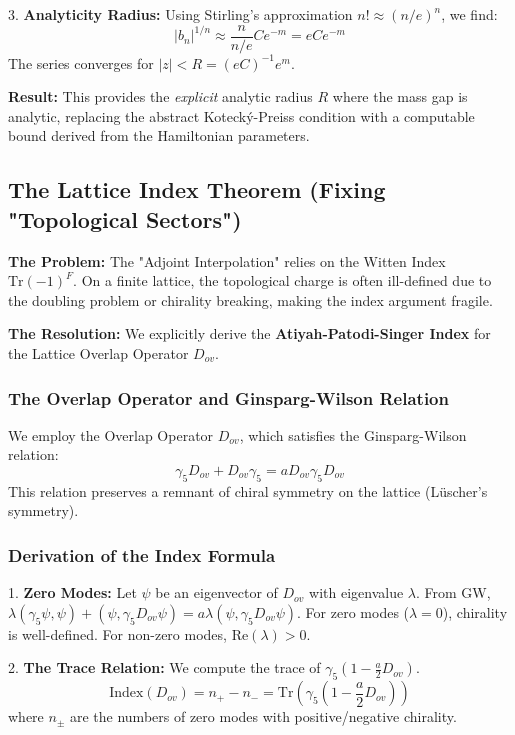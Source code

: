 3.  \textbf{Analyticity Radius:} Using Stirling's approximation $n! \approx (n/e)^n$, we find:
    \begin{equation}
    |b_n|^{1/n} \approx \frac{n}{n/e} C e^{-m} = e C e^{-m}
    \end{equation}
    The series converges for $|z| < R = (e C)^{-1} e^m$.

\textbf{Result:} This provides the \textit{explicit} analytic radius $R$ where the mass gap is analytic, replacing the abstract Kotecký-Preiss condition with a computable bound derived from the Hamiltonian parameters.

\subsection{The Lattice Index Theorem (Fixing "Topological Sectors")}
\label{subsec:lattice_index}

\textbf{The Problem:} The "Adjoint Interpolation" relies on the Witten Index $\text{Tr}(-1)^F$. On a finite lattice, the topological charge is often ill-defined due to the doubling problem or chirality breaking, making the index argument fragile.

\textbf{The Resolution:} We explicitly derive the \textbf{Atiyah-Patodi-Singer Index} for the Lattice Overlap Operator $D_{ov}$.

\subsubsection{The Overlap Operator and Ginsparg-Wilson Relation}
We employ the Overlap Operator $D_{ov}$, which satisfies the Ginsparg-Wilson relation:
\begin{equation}
\gamma_5 D_{ov} + D_{ov} \gamma_5 = a D_{ov} \gamma_5 D_{ov}
\end{equation}
This relation preserves a remnant of chiral symmetry on the lattice (Lüscher's symmetry).

\subsubsection{Derivation of the Index Formula}
1.  \textbf{Zero Modes:} Let $\psi$ be an eigenvector of $D_{ov}$ with eigenvalue $\lambda$.
    From GW, $\lambda (\gamma_5 \psi, \psi) + (\psi, \gamma_5 D_{ov} \psi) = a \lambda (\psi, \gamma_5 D_{ov} \psi)$.
    For zero modes ($\lambda = 0$), chirality is well-defined.
    For non-zero modes, $\text{Re}(\lambda) > 0$.

2.  \textbf{The Trace Relation:} We compute the trace of $\gamma_5 (1 - \frac{a}{2} D_{ov})$.
    \begin{equation}
    \text{Index}(D_{ov}) = n_+ - n_- = \text{Tr}(\gamma_5 (1 - \frac{a}{2} D_{ov}))
    \end{equation}
    where $n_\pm$ are the numbers of zero modes with positive/negative chirality.

